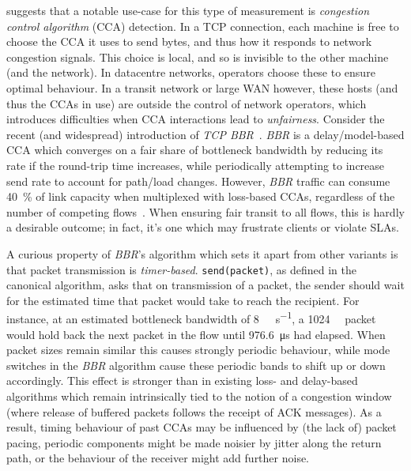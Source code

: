 

 suggests that a notable use-case for this type of measurement is \emph{congestion control algorithm} (CCA) detection.
In a TCP connection, each machine is free to choose the CCA it uses to send bytes, and thus how it responds to network congestion signals.
This choice is local, and so is invisible to the other machine (and the network).
In datacentre networks, operators choose these to ensure optimal behaviour.
In a transit network or large WAN however, these hosts (and thus the CCAs in use) are outside the control of network operators, which introduces difficulties when CCA interactions lead to \emph{unfairness}.
Consider the recent (and widespread) introduction of \emph{TCP BBR}~\cite{cardwell2016bbr}.
\emph{BBR} is a delay/model-based CCA which converges on a fair share of bottleneck bandwidth by reducing its rate if the round-trip time increases, while periodically attempting to increase send rate to account for path/load changes.
However, \emph{BBR} traffic can consume \SI{40}{\percent} of link capacity when multiplexed with loss-based CCAs, regardless of the number of competing flows~\cite{DBLP:conf/imc/WareMSS19}. 
When ensuring fair transit to all flows, this is hardly a desirable outcome; in fact, it's one which may frustrate clients or violate SLAs.

A curious property of \emph{BBR}'s algorithm which sets it apart from other variants is that packet transmission is \emph{timer-based}.
\texttt{send(packet)}, as defined in the canonical algorithm, asks that on transmission of a packet, the sender should wait for the estimated time that packet would take to reach the recipient.
For instance, at an estimated bottleneck bandwidth of \SI{8}{\mega\bit\per\second}, a \SI{1024}{\kilo\byte} packet would hold back the next packet in the flow until \SI{976.6}{\micro\second} had elapsed.
When packet sizes remain similar this causes strongly periodic behaviour, while mode switches in the \emph{BBR} algorithm cause these periodic bands to shift up or down accordingly.
This effect is stronger than in existing loss- and delay-based algorithms which remain intrinsically tied to the notion of a congestion window (where release of buffered packets follows the receipt of ACK messages).
As a result, timing behaviour of past CCAs may be influenced by (the lack of) packet pacing, periodic components might be made noisier by jitter along the return path, or the behaviour of the receiver might add further noise.

